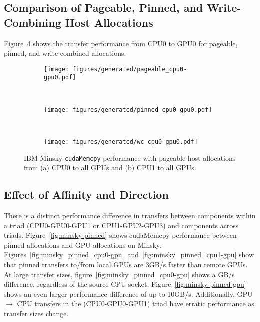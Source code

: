 \subsection{Comparison of Pageable, Pinned, and Write-Combining Host Allocations}

Figure~\ref{fig:pageable-pinned-wc} shows the transfer performance from CPU0 to GPU0 for pageable, pinned, and write-combined allocations.

\begin{figure}[ht]
    \centering
    \begin{subfigure}[b]{0.3\textwidth}
        \texttt{[image: figures/generated/pageable\_cpu0-gpu0.pdf]}
        \caption{}
        \label{fig:}
    \end{subfigure}
    ~
    \begin{subfigure}[b]{0.3\textwidth}
        \texttt{[image: figures/generated/pinned\_cpu0-gpu0.pdf]}
        \caption{}
        \label{fig:}
    \end{subfigure}
    ~
    \begin{subfigure}[b]{0.3\textwidth}
        \texttt{[image: figures/generated/wc\_cpu0-gpu0.pdf]}
        \caption{}
        \label{fig:}
    \end{subfigure}
    \caption[]{
        IBM Minsky \texttt{cudaMemcpy} performance with pageable host allocations from (a) CPU0 to all GPUs and (b) CPU1 to all GPUs.
    }
    \label{fig:pageable-pinned-wc}
\end{figure}

\subsection{Effect of Affinity and Direction}

There is a distinct performance difference in transfers between components within a triad (CPU0-GPU0-GPU1 or CPU1-GPU2-GPU3) and components across triads.
Figure~\ref{fig:minsky-pinned} shows cudaMemcpy performance between pinned allocations and GPU allocations on Minsky.
Figures~\ref{fig:minsky_pinned_cpu0-gpu}~and~\ref{fig:minsky_pinned_cpu1-gpu} show that pinned transfers to/from local GPUs are 3GB/s faster than remote GPUs.
At large transfer sizes, figure~\ref{fig:minsky_pinned_cpu0-gpu} shows a  GB/s difference, regardless of the source CPU socket.
Figure~\ref{fig:minsky-pinned-gpu} shows an even larger performance difference of up to 10GB/s.
Additionally, GPU $\rightarrow$ CPU transfers in the (CPU0-GPU0-GPU1) triad have erratic performance as transfer sizes change.


